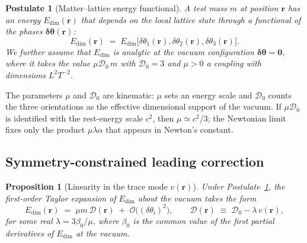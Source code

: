 \documentclass[a4paper,fleqn]{cas-dc}
\theoremstyle{thmstyleone}%
\newtheorem{proposition}[theorem]{Proposition}
\theoremstyle{thmstyletwo}%
\newtheorem{postulate}{Postulate}%
\begin{document}
\begin{postulate}[Matter--lattice energy functional]
\label{post:coupling}
A test mass $m$ at position $\mathbf{r}$ has an energy
$E_{\mathrm{dim}}(\mathbf{r})$ that depends on the local
lattice state through a functional of the phases
$\boldsymbol{\delta\theta}(\mathbf{r})$:
\begin{equation}
    E_{\mathrm{dim}}(\mathbf{r})
    \;=\;
    E_{\mathrm{dim}}\bigl[\delta\theta_1(\mathbf{r}),
    \delta\theta_2(\mathbf{r}),\delta\theta_3(\mathbf{r})\bigr].
\end{equation}
We further assume that $E_{\mathrm{dim}}$ is analytic at the
vacuum configuration $\boldsymbol{\delta\theta}=\mathbf{0}$,
where it takes the value $\mu\mathcal{D}_0\,m$ with
$\mathcal{D}_0=3$ and $\mu>0$ a coupling with dimensions
$L^2T^{-2}$.
\end{postulate}

The parameters $\mu$ and $\mathcal{D}_0$ are kinematic: $\mu$
sets an energy scale and $\mathcal{D}_0$ counts the three
orientations as the effective dimensional support of the
vacuum. If $\mu\mathcal{D}_0$ is identified with the rest-energy
scale $c^2$, then $\mu\simeq c^2/3$; the Newtonian limit fixes
only the product $\mu\lambda\alpha$ that appears in Newton's
constant.

\subsection{Symmetry-constrained leading correction}

\begin{proposition}[Linearity in the trace mode $v(\mathbf{r})$]
\label{prop:linearity}
Under Postulate~\ref{post:coupling}, the first-order Taylor
expansion of $E_{\mathrm{dim}}$ about the vacuum takes the
form
\begin{equation}
    E_{\mathrm{dim}}(\mathbf{r})
    \;=\;
    \mu m\,\mathcal{D}(\mathbf{r})
    \;+\;
    \mathcal{O}\!\bigl((\delta\theta_i)^2\bigr),
    \qquad
    \mathcal{D}(\mathbf{r})
    \;\equiv\;
    \mathcal{D}_0-\lambda\,v(\mathbf{r}),
    \label{eq:edim_linear}
\end{equation}
for some real $\lambda=3\beta_0/\mu$, where $\beta_0$ is
the common value of the first partial derivatives of
$E_{\mathrm{dim}}$ at the vacuum.
\end{proposition}
\end{document}
